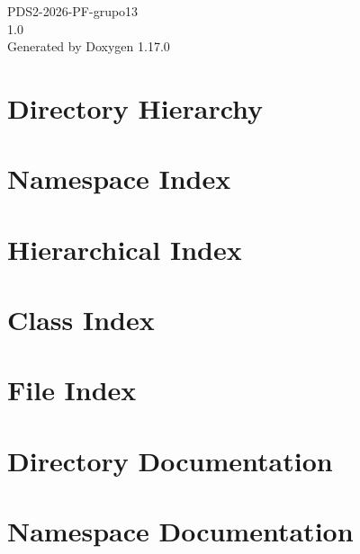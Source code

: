 \documentclass[twoside]{book}
\newcommand{\+}{\discretionary{\mbox{\scriptsize$\hookleftarrow$}}{}{}}
\newcommand{\clearemptydoublepage}{%
    \newpage{\pagestyle{empty}\cleardoublepage}%
  }
\begin{document}
  \raggedbottom
    \hypersetup{pageanchor=false,
                bookmarksnumbered=true,
                pdfencoding=unicode
               }
  \begin{titlepage}
  \vspace*{7cm}
  \begin{center}%
  {\Large PDS2-\/2026-\/\+PF-\/grupo13}\\
  [1ex]\large 1.\+0 \\
  \vspace*{1cm}
  {\large Generated by Doxygen 1.17.0}\\
  \end{center}
  \end{titlepage}
  \clearemptydoublepage
  \tableofcontents
  \clearemptydoublepage
  \hypersetup{pageanchor=true}



\chapter{Directory Hierarchy}

\chapter{Namespace Index}

\chapter{Hierarchical Index}

\chapter{Class Index}

\chapter{File Index}

\chapter{Directory Documentation}




\chapter{Namespace Documentation}









\end{document}
